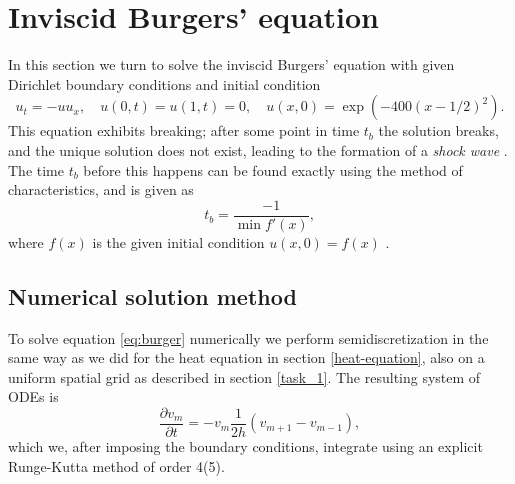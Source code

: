 %
%    

\newpage
\section{Inviscid Burgers' equation}

In this section we turn to solve the inviscid Burgers' equation with given Dirichlet boundary conditions and initial condition
\begin{equation}
    u_t = -uu_x, \quad u(0, t) = u(1, t) = 0, \quad u(x, 0) = \exp\left(-400(x-1/2)^2\right).
    \label{eq:burger}
\end{equation}
This equation exhibits breaking; 
after some point in time $t_b$ the solution breaks, 
and the unique solution does not exist, 
leading to the formation of a \textit{shock wave} \cite{LeVeque}. 
The time $t_b$ before this happens can be found exactly using the method of characteristics, 
and is given as 
\begin{equation}
    t_b = \frac{-1}{\min f'(x)}, 
    \label{eq:t_break}
\end{equation}
where $f(x)$ is the given initial condition $u(x, 0) = f(x)$ \cite{LeVeque}. 

\subsection*{Numerical solution method}
To solve equation \eqref{eq:burger} numerically we perform semidiscretization in the same way as we did for the heat equation in section \ref{heat-equation}, 
also on a uniform spatial grid as described in section \ref{task_1}. 
The resulting system of ODEs is
\begin{equation*}
    \frac{\partial v_m}{\partial t} = -v_m \frac{1}{2h} (v_{m+1} - v_{m-1}), 
\end{equation*}
which we, after imposing the boundary conditions, 
integrate using an explicit Runge-Kutta method of order 4(5). 

